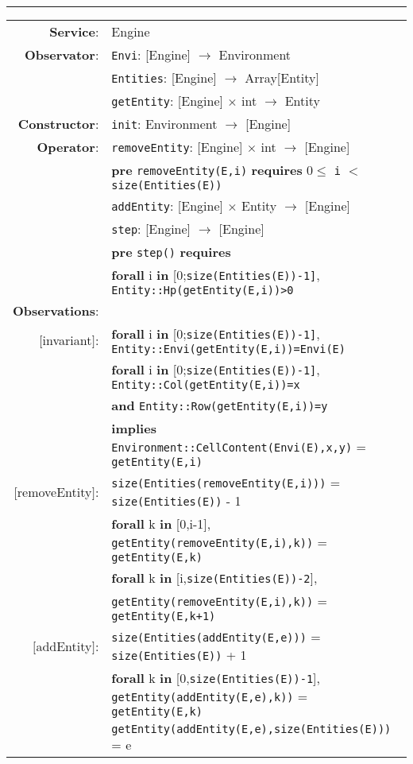 \vspace{5mm}\hrule\vspace{5mm}

\begin{tabular}{rl}
\textbf{Service}: & Engine \\
\textbf{Observator}: & \texttt{Envi}: \textrm{[Engine]} $\rightarrow$ \textrm{Environment} \\
& \texttt{Entities}: \textrm{[Engine]} $\rightarrow$ \textrm{Array[Entity]} \\
& \texttt{getEntity}: \textrm{[Engine]} $\times$ \textrm{int} $\rightarrow$ \textrm{Entity} \\
\textbf{Constructor}: & \texttt{init}: \textrm{Environment} $\rightarrow$ \textrm{[Engine]}\\
\textbf{Operator}: & 
\texttt{removeEntity}: \textrm{[Engine]} $\times$ \textrm{int} $\rightarrow$ \textrm{[Engine]} \\
& \quad \textbf{pre} \texttt{removeEntity(E,i)} \textbf{requires} $0 \leq$ \texttt{i} $<$ \texttt{size(Entities(E))} \\
& \texttt{addEntity}: \textrm{[Engine]} $\times$ \textrm{Entity} $\rightarrow$ \textrm{[Engine]} \\
& \texttt{step}: \textrm{[Engine]} $\rightarrow$ \textrm{[Engine]}\\
& \quad \textbf{pre} \texttt{step()} \textbf{requires}\\
&
\quad \textbf{forall} i \textbf{in} [0;\texttt{size(Entities(E))-1]}, \texttt{Entity::Hp(getEntity(E,i))>0} \\
\textbf{Observations}: & \\
$[$invariant$]$: & \textbf{forall} i \textbf{in} [0;\texttt{size(Entities(E))-1]}, \texttt{Entity::Envi(getEntity(E,i))=Envi(E)} \\
& \textbf{forall} i \textbf{in} [0;\texttt{size(Entities(E))-1]}, \texttt{Entity::Col(getEntity(E,i))=x} \\ & \quad\quad\quad\quad\textbf{and} \texttt{Entity::Row(getEntity(E,i))=y} \\
& \quad\quad\quad\quad \textbf{implies} \texttt{Environment::CellContent(Envi(E),x,y)} = \texttt{getEntity(E,i)}  \\
$[$removeEntity$]$: & \texttt{size(Entities(removeEntity(E,i)))} = \texttt{size(Entities(E))} - 1 \\
& \textbf{forall} k \textbf{in} [0,i-1], \texttt{getEntity(removeEntity(E,i),k))} = \texttt{getEntity(E,k)} \\
& \textbf{forall} k \textbf{in} [i,\texttt{size(Entities(E))-2}],
\\
& \quad \texttt{getEntity(removeEntity(E,i),k))} = \texttt{getEntity(E,k+1)} \\
$[$addEntity$]$: & \texttt{size(Entities(addEntity(E,e)))} = \texttt{size(Entities(E))} + 1 \\
& \textbf{forall} k \textbf{in} [0,\texttt{size(Entities(E))-1}], \texttt{getEntity(addEntity(E,e),k))} = \texttt{getEntity(E,k)} \\
& \texttt{getEntity(addEntity(E,e),size(Entities(E)))} = e 
\end{tabular}
